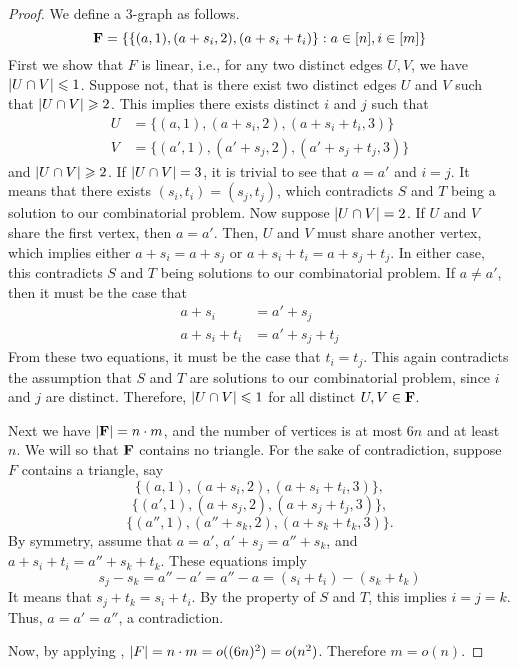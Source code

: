 \begin{proof}
	We define a 3-graph as follows. 
	$$ {\mathbf F} = \{ \{(a,1), (a+s_i, 2), (a + s_i + t_i)\} : a \in [n], i \in [m] \} $$
	First we show that $ F $ is linear, i.e., for any two distinct edges $ U,V $, we have $ \left\vert{U \cap V}\right\vert \leqslant 1 $. Suppose not, that is there exist two distinct edges $U$ and $V$ such that $\abs{U\intersect V} \geq 2$. This implies there exists distinct $i$ and $j$ such that
	\begin{align*}
		U &= \{ (a,1), (a+s_i,2), (a+s_i + t_i, 3) \}\\
		V &= \{ (a',1), (a'+s_j,2), (a'+s_j+t_j,3) \}
	\end{align*}
	and $\left\vert{U\cap V}\right\vert \geqslant 2$. If $\left\vert{U\cap V}\right\vert = 3$, it is trivial to see that $a=a'$ and $i=j$. It means that there exists $(s_i,t_i) = (s_j,t_j)$, which contradicts $S$ and $T$ being a solution to our combinatorial problem. Now suppose $\left\vert{U\cap V}\right\vert = 2$. If $U$ and $V$ share the first vertex, then $a = a'$. Then, $U$ and $V$ must share another vertex, which implies either $a+s_i = a+s_j$ or $a+s_i+t_i = a+s_j+t_j$. In either case, this contradicts $S$ and $T$ being solutions to our combinatorial problem. If $a\neq a'$, then it must be the case that
	\begin{align*}
		a+s_i &= a'+s_j\\
		a+s_i+t_i &= a'+s_j+t_j
	\end{align*}
	From these two equations, it must be the case that $t_i = t_j$. This again contradicts the assumption that $S$ and $T$ are solutions to our combinatorial problem, since $i$ and $j$ are distinct. Therefore, $\left\vert{U\cap V}\right\vert \leqslant 1$ for all distinct $U, V \in {\mathbf F}$.
	
	Next we have $ \left\vert{\ensuremath{{\mathbf F}}}\right\vert = n \cdot m$, and the number of vertices is at most $6n$ and at least $n$. We will so that $ {\mathbf F} $ contains no triangle. For the sake of contradiction, suppose $ F $ contains a triangle, say
	$$  \{ (a, 1), (a+s_i, 2), (a+ s_i + t_i, 3)\}, $$
	$$ \{ (a', 1), (a+s_j, 2), (a+ s_j + t_j, 3)\}, $$
	$$ \{ (a'', 1), (a''+s_k, 2), (a+ s_k + t_k, 3)\}. $$
	By symmetry, assume that $ a = a'$, $a' + s_j = a'' + s_k$, and $a + s_i+ t_i = a'' + s_k + t_k $.
	These equations imply
	$$ s_j - s_k = a'' - a' = a'' - a = (s_i + t_i) - (s_k + t_k)$$
	It means that $ s_j + t_k = s_i + t_i $. By the property of $ S $ and $ T $, this implies $  i = j = k $. Thus, $ a = a' = a'' $, a contradiction.
	
	Now, by applying , $ \left\vert{F}\right\vert = n \cdot m = o((6n)^2) = o(n^2) $. Therefore $ m = o(n) $. 
\end{proof}


